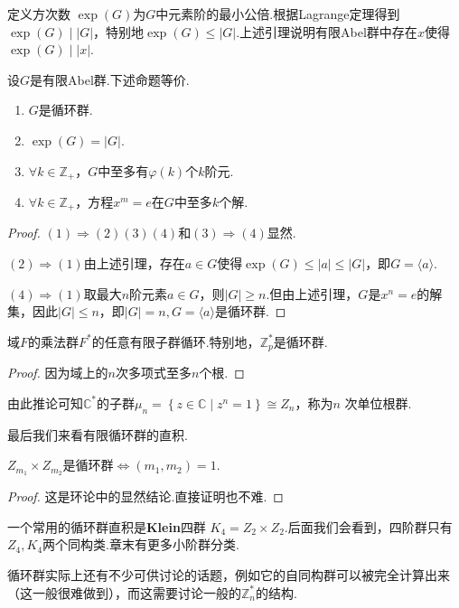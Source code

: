 定义{\heiti 方次数} $\exp(G)$为$G$中元素阶的最小公倍.根据Lagrange定理得到$\exp(G)\mid|G|$，特别地$\exp(G)\le |G|$.上述引理说明有限Abel群中存在$x$使得$\exp(G)\mid|x|$.
\begin{thm}
	设$G$是有限Abel群.下述命题等价.
	\begin{enumerate}
		\item $G$是循环群.
		\item $\exp(G)=|G|$.
		\item $\forall k\in\mathbb{Z}_+$，$G$中至多有$\varphi(k)$个$k$阶元.
		\item $\forall k\in\mathbb{Z}_+$，方程$x^m=e$在$G$中至多$k$个解.
	\end{enumerate}
\end{thm}
\begin{proof}
	\hspace*{5.4pt}$(1)\Rightarrow(2)(3)(4)$和$(3)\Rightarrow(4)$显然.

	$(2)\Rightarrow(1)$由上述引理，存在$a\in G$使得$\exp(G)\le|a|\le|G|$，即$G=\langle a\rangle $.

	$(4)\Rightarrow(1)$取最大$n$阶元素$a\in G$，则$|G|\ge n$.但由上述引理，$G$是$x^n=e$的解集，因此$|G|\le n$，即$|G|=n,G=\langle a\rangle $是循环群.
\end{proof}
\begin{cor}
	域$F$的乘法群$F^*$的任意有限子群循环.特别地，$\mathbb{Z}_p^*$是循环群.
\end{cor}
\begin{proof}
	因为域上的$n$次多项式至多$n$个根.
\end{proof}

由此推论可知$\mathbb{C}^*$的子群$\mu_n=\left\{z\in\mathbb{C}\mid z^n=1\right\}\cong Z_n$，称为$n$ {\heiti 次单位根群}.

最后我们来看有限循环群的直积.
\begin{prop}
	$Z_{m_1}\times Z_{m_2}$是循环群$\Leftrightarrow(m_1,m_2)=1$.
\end{prop}
\begin{proof}
	这是环论中的显然结论.直接证明也不难.
\end{proof}

一个常用的循环群直积是{\heiti \textbf{Klein}四群} $K_4=Z_2\times Z_2$.后面我们会看到，四阶群只有$Z_4,K_4$两个同构类.章末有更多小阶群分类.

\begin{remark}
	循环群实际上还有不少可供讨论的话题，例如它的自同构群可以被完全计算出来（这一般很难做到），而这需要讨论一般的$\mathbb{Z}_n^*$的结构.
\end{remark}

